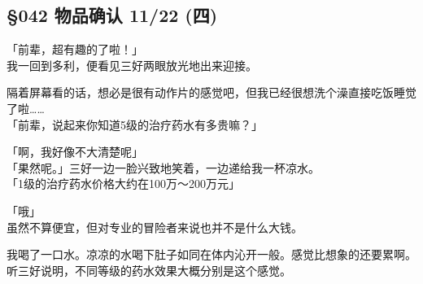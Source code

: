 \subsection{§042 物品确认 11/22 (四)}

「前辈，超有趣的了啦！」\\

我一回到多利，便看见三好两眼放光地出来迎接。

隔着屏幕看的话，想必是很有动作片的感觉吧，但我已经很想洗个澡直接吃饭睡觉了啦……\\

「前辈，说起来你知道5级的治疗药水有多贵嘛？」

「啊，我好像不大清楚呢」\\

「果然呢。」三好一边一脸兴致地笑着，一边递给我一杯凉水。\\

「1级的治疗药水价格大约在100万～200万元」

「哦」\\

虽然不算便宜，但对专业的冒险者来说也并不是什么大钱。

我喝了一口水。凉凉的水喝下肚子如同在体内沁开一般。感觉比想象的还要累啊。\\

听三好说明，不同等级的药水效果大概分别是这个感觉。\\

